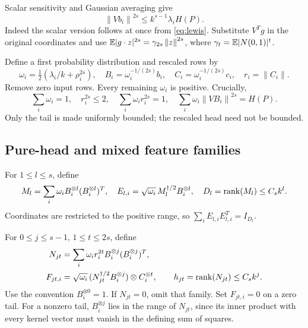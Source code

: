 \documentclass[11pt]{article}
\theoremstyle{remark}\newtheorem{remark}[theorem]{Remark}
\newcommand{\norm}[1]{\left\|#1\right\|}\newcommand{\ip}[2]{\left\langle #1,#2\right\rangle}
\begin{document}
Scalar sensitivity and Gaussian averaging give
\begin{equation}\label{eq:head-sensitivity}
 \norm{Vb_i}^{2s}\le k^{s-1}\lambda_i H(P).
\end{equation}
Indeed the scalar version follows at once from \eqref{eq:lewis}. Substitute $V^Tg$ in the original coordinates and use $\E|g\cdot z|^{2s}=\gamma_{2s}\norm z^{2s}$, where $\gamma_t=\mathbb E|N(0,1)|^t$.

Define a first probability distribution and rescaled rows by
\begin{equation}\label{eq:omega}
 \omega_i=\tfrac12(\lambda_i/k+\rho_i^{2s}),\quad
 B_i=\omega_i^{-1/(2s)}b_i,\quad C_i=\omega_i^{-1/(2s)}c_i,\quad r_i=\norm{C_i}.
\end{equation}
Remove zero input rows. Every remaining $\omega_i$ is positive. Crucially,
\begin{equation}\label{eq:bounded-tail}
 \sum_i\omega_i=1,\quad r_i^{2s}\le2,\quad
 \sum_i\omega_i r_i^{2s}=1,\quad
 \sum_i\omega_i\norm{VB_i}^{2s}=H(P).
\end{equation}
Only the tail is made uniformly bounded; the rescaled head need not be bounded.

\subsection{Pure-head and mixed feature families}
For $1\le l\le s$, define
\begin{equation}\label{eq:E}
 M_l=\sum_i\omega_i B_i^{\otimes l}(B_i^{\otimes l})^T,\quad
 E_{l,i}=\sqrt{\omega_i}\,M_l^{\dagger/2}B_i^{\otimes l},\quad D_l=\operatorname{rank}(M_l)\le C_s k^l.
\end{equation}
Coordinates are restricted to the positive range, so $\sum_iE_{l,i}E_{l,i}^T=I_{D_l}$.

For $0\le j\le s-1$, $1\le t\le2s$, define
\begin{equation}\label{eq:F}
 \begin{split}
 N_{jt}&=\sum_i\omega_i r_i^{2t}B_i^{\otimes j}(B_i^{\otimes j})^T,\\
 F_{jt,i}&=\sqrt{\omega_i}\,(N_{jt}^{\dagger/2}B_i^{\otimes j})\otimes C_i^{\otimes t},
 \qquad h_{jt}=\operatorname{rank}(N_{jt})\le C_s k^j.
 \end{split}
\end{equation}
Use the convention $B_i^{\otimes0}=1$. If $N_{jt}=0$, omit that family. Set $F_{jt,i}=0$ on a zero tail. For a nonzero tail, $B_i^{\otimes j}$ lies in the range of $N_{jt}$, since its inner product with every kernel vector must vanish in the defining sum of squares.
\end{document}

